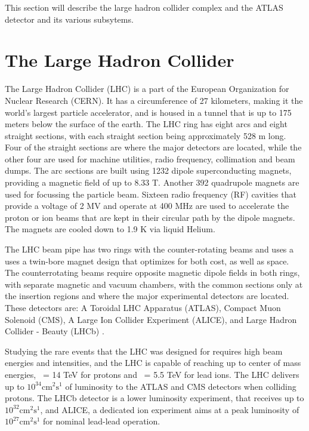 This section will describe the large hadron collider complex and the ATLAS detector and its various subsytems.

\section{The Large Hadron Collider}

The Large Hadron Collider (LHC) is a part of the European Organization for Nuclear Research (CERN). It has a circumference of 27 kilometers, making it the world's largest particle accelerator, and is housed in a tunnel that is up to 175 meters below the surface of the earth. The LHC ring has eight arcs and eight straight sections, with each straight section being approximately 528 m long. Four of the straight sections are where the major detectors are located, while the other four are used for machine utilities, radio frequency, collimation and beam dumps. The arc sections are built using 1232 dipole superconducting magnets, providing a magnetic field of up to 8.33 T. Another 392 quadrupole magnets are used for focussing the particle beam. Sixteen radio frequency (RF) cavities that provide a voltage of 2 MV and operate at 400 MHz are used to accelerate the proton or ion beams that are kept in their circular path by the dipole magnets. The magnets are cooled down to 1.9 K via liquid Helium. 

The LHC beam pipe has two rings with the counter-rotating beams and uses a uses a twin-bore magnet design that optimizes for both cost, as well as space. The counterrotating beams require opposite magnetic dipole fields in both rings, with separate magnetic and vacuum chambers, with the common sections only at the insertion regions and where the major experimental detectors are located. These detectors are: A Toroidal LHC Apparatus (ATLAS), Compact Muon Solenoid (CMS), A Large Ion Collider Experiment (ALICE), and Large Hadron Collider - Beauty (LHCb) \cite{Evans:2008zzb}.

Studying the rare events that the LHC was designed for requires high beam energies and intensities, and the LHC is capable of reaching up to center of mass energies, \sqrts\ = 14 TeV for protons and \sqrtsnn\ = 5.5 TeV for lead ions. The LHC delivers up to $10^{34} \mathrm{cm}^2\mathrm{s}^1$ of luminosity to the ATLAS and CMS detectors when colliding protons. The LHCb detector is a lower luminosity experiment, that receives up to $10^{32} \mathrm{cm}^2\mathrm{s}^1$, and ALICE, a dedicated ion experiment aims at a peak luminosity of $10^{27} \mathrm{cm}^2\mathrm{s}^1$ for nominal lead-lead operation.

